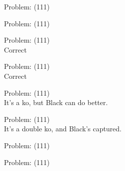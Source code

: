 \documentclass[11pt]{article}
\begin{document}
\begin{minipage}[t]{0.5\textwidth}
  {\centering
  
Problem: (111)\\
  }
\end{minipage}
\begin{minipage}[t]{0.5\textwidth}
  {\centering
  
Problem: (111)\\
  }
\end{minipage}
\begin{minipage}[t]{0.5\textwidth}
  {\centering
  
Problem: (111)\\
Correct\\
  }
\end{minipage}
\begin{minipage}[t]{0.5\textwidth}
  {\centering
  
Problem: (111)\\
Correct\\
  }
\end{minipage}
\begin{minipage}[t]{0.5\textwidth}
  {\centering
  
Problem: (111)\\
It's a ko, but Black can do better.\\
  }
\end{minipage}
\begin{minipage}[t]{0.5\textwidth}
  {\centering
  
Problem: (111)\\
It's a double ko, and Black's captured.\\
  }
\end{minipage}
\begin{minipage}[t]{0.5\textwidth}
  {\centering
  
Problem: (111)\\
  }
\end{minipage}
\begin{minipage}[t]{0.5\textwidth}
  {\centering
  
Problem: (111)\\
  }
\end{minipage}
\end{document}
